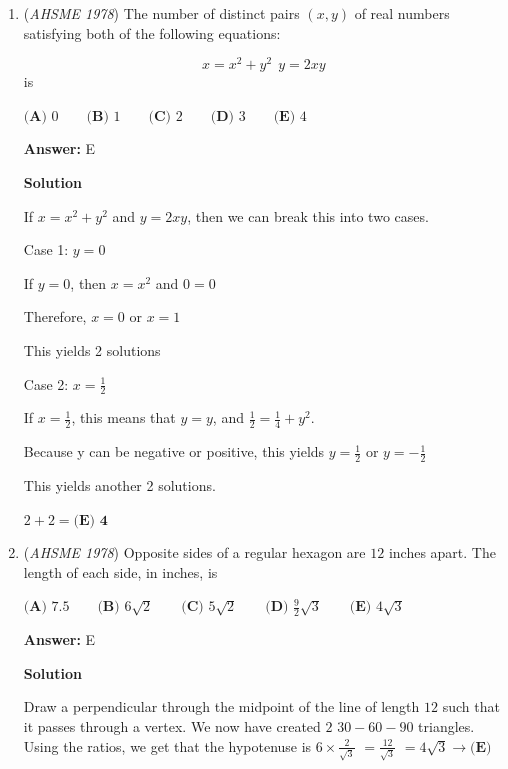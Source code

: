\begin{enumerate}
 Summing it up, we get $\textdollar 20 + \textdollar 15 + \textdollar 12 = \textdollar 47$.Therefore, our answer is $\textdollar 60 - \textdollar 47 = \boxed{\textbf{(C) }\textdollar 13}$~awin

 


	\item (\textit{AHSME 1978}) The number of distinct pairs $(x,y)$ of real numbers satisfying both of the following equations: 


 
 \[x=x^2+y^2 \    \ y=2xy\] 
is


 $\textbf{(A) }0\qquad \textbf{(B) }1\qquad \textbf{(C) }2\qquad \textbf{(D) }3\qquad  \textbf{(E) }4$

 \textbf{Answer: }E



\textbf{Solution}

If $x=x^2+y^2$ and $y=2xy$, then we can break this into two cases.

 Case 1: $y = 0$

 If $y = 0$, then $x = x^2$ and $0 = 0$

 Therefore, $x = 0$ or $x = 1$

 This yields 2 solutions

 Case 2: $x = \frac{1}{2}$ 

 If $x = \frac{1}{2}$, this means that $y = y$, and $\frac{1}{2} = \frac{1}{4} + y^2$. 

 Because y can be negative or positive, this yields $y = \frac{1}{2}$ or $y = -\frac{1}{2}$

 This yields another 2 solutions.

 $2+2 = \boxed{\textbf{(E) 4}}$



	\item (\textit{AHSME 1978}) Opposite sides of a regular hexagon are $12$ inches apart. The length of each side, in inches, is


 $\textbf{(A) }7.5\qquad \textbf{(B) }6\sqrt{2}\qquad \textbf{(C) }5\sqrt{2}\qquad \textbf{(D) }\frac{9}{2}\sqrt{3}\qquad \textbf{(E) }4\sqrt{3}$

 \textbf{Answer: }E



\textbf{Solution}

Draw a perpendicular through the midpoint of the line of length $12$ such that it passes through a vertex. We now have created $2$ $30-60-90$ triangles. Using the ratios, we get that the hypotenuse is $6 \times \frac {2}{\sqrt{3}}$ $= \frac {12}{\sqrt {3}}$ $= 4\sqrt{3} \rightarrow \boxed {\textbf{(E)}}$




\end{enumerate}

